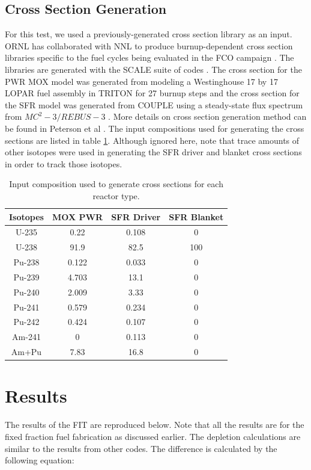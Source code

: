 \documentclass{article}
\begin{document}
\subsection{Cross Section Generation}
For this test, we used a previously-generated cross section library as an input.
\gls{ORNL} has collaborated with \gls{NNL} to produce burnup-dependent cross section libraries specific to the fuel
cycles being evaluated in the FCO campaign \cite{wigeland_nuclear_2014}. The libraries are generated with the
SCALE suite of codes \cite{noauthor_scale_nodate}. The cross section for the \gls{PWR} \gls{MOX} model was generated from modeling
a Westinghouse 17 by 17 LOPAR fuel assembly in TRITON for 27 burnup steps and the cross section for the \gls{SFR}
model was generated from COUPLE using a steady-state flux spectrum from $MC^2-3 / REBUS-3$ \cite{lee_mc2-3:_2013}.
More details on cross section generation method can be found in Peterson et al \cite{peterson_generating_2016}. The
input compositions used for generating the cross sections are listed in table \ref{tab:inp}. Although ignored here, note that trace amounts
of other isotopes were used in generating the \gls{SFR}
driver and blanket cross sections in order to track
those isotopes.

\begin{table}[htbp!]
    \centering
    \begin{tabular}{c|ccc}
        \hline
        Isotopes & \gls{MOX} \gls{PWR} & \gls{SFR} Driver & \gls{SFR} Blanket  \\
        \hline
        U-235 & 0.22 & 0.108 & 0 \\
        U-238 & 91.9 & 82.5  & 100 \\
        Pu-238 & 0.122 & 0.033 & 0 \\
        Pu-239 & 4.703 & 13.1 & 0 \\
        Pu-240 & 2.009 & 3.33 & 0\\
        Pu-241 & 0.579 & 0.234 & 0 \\
        Pu-242 & 0.424 & 0.107 & 0 \\
        Am-241 & 0 & 0.113 & 0 \\
        \hline
        \hline
        Am+Pu & 7.83 & 16.8 & 0 \\
        \hline
    \end{tabular}
    \caption{Input composition used to generate cross sections for each reactor type.}
    \label{tab:inp}
\end{table}


\section{Results}
The results of the \gls{FIT} are reproduced below. Note that all the results are for the fixed fraction
fuel fabrication as discussed earlier. The depletion calculations are similar to the
results from other codes. The difference is calculated by the following equation:
\end{document}
